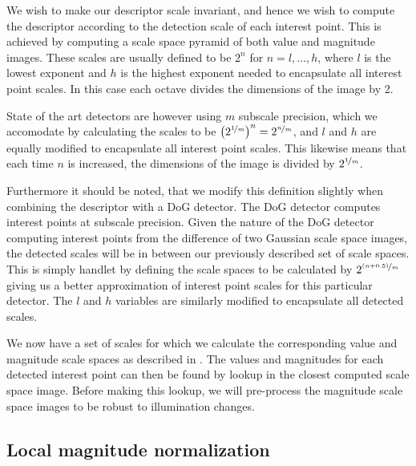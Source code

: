 \documentclass[thesis.tex]{subfiles}
\begin{document}
We wish to make our descriptor scale invariant, and hence we wish to compute the descriptor according to the detection scale of each interest point. This is achieved by computing a scale space pyramid of both value and magnitude images. These scales are usually defined to be $2^n$ for $n = l,\hdots,h$, where $l$ is the lowest exponent and $h$ is the highest exponent needed to encapsulate all interest point scales. In this case each octave divides the dimensions of the image by 2.

State of the art detectors are however using $m$ subscale precision, which we accomodate by calculating the scales to be $\left(2^{\nicefrac{1}{m}}\right)^n = 2^{\nicefrac{n}{m}}$, and $l$ and $h$ are equally modified to encapsulate all interest point scales. This likewise means that each time $n$ is increased, the dimensions of the image is divided by $2^{\nicefrac{1}{m}}$.

Furthermore it should be noted, that we modify this definition slightly when combining the descriptor with a DoG detector. The DoG detector computes interest points at subscale precision. Given the nature of the DoG detector computing interest points from the difference of two Gaussian scale space images, the detected scales will be in between our previously described set of scale spaces. This is simply handlet by defining the scale spaces to be calculated by $2^{\nicefrac{(n+0.5)}{m}}$ giving us a better approximation of interest point scales for this particular detector. The $l$ and $h$ variables are similarly modified to encapsulate all detected scales.

We now have a set of scales for which we calculate the corresponding value and magnitude scale spaces as described in . The values and magnitudes for each detected interest point can then be found by lookup in the closest computed scale space image. Before making this lookup, we will pre-process the magnitude scale space images to be robust to illumination changes.

\subsection{Local magnitude normalization}
\end{document}
